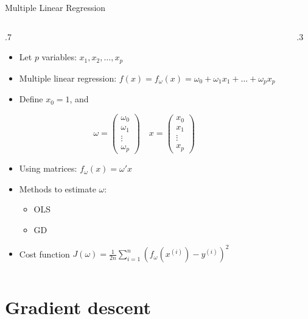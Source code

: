 \documentclass[
  9pt,
  ignorenonframetext,
  aspectratio=169,
  t, dvipsnames]{beamer}
\providecommand{\tightlist}{%
  \setlength{\itemsep}{0pt}\setlength{\parskip}{0pt}}\usepackage{longtable,booktabs,array}
\theoremstyle{definition}
\def\begincols{\begin{columns}}
\def\begincol{\begin{column}}
\def\endcol{\end{column}}
\def\endcols{\end{columns}}
\begin{document}
\begin{frame}{Multiple Linear Regression}
\protect\hypertarget{multiple-linear-regression-1}{}
\begincols

\begincol{.7\textwidth}

\begin{itemize}
\tightlist
\item
  Let \(p\) variables: \(x_1, x_2, \ldots, x_p\)
\item
  Multiple linear regression:
  \(f(x) = f_{\omega}(x) = \omega_0 + \omega_1 x_1 + \ldots + \omega_p x_p\)
\item
  Define \(x_0 = 1\), and
\end{itemize}

\[\omega = \begin{pmatrix}
    \omega_{0} \\
    \omega_{1} \\
    \vdots \\
    \omega_{p}
    \end{pmatrix}    \quad  x = \begin{pmatrix}
    x_{0} \\
    x_{1} \\
    \vdots \\
    x_{p}
    \end{pmatrix}\]

\begin{itemize}
\tightlist
\item
  Using matrices: \(f_{\omega}(x) = \omega' x\)
\item
  Methods to estimate \(\omega\):

  \begin{itemize}
  \tightlist
  \item
    OLS
  \item
    GD
  \end{itemize}
\item
  Cost function
  \(J(\omega) = \frac{1}{2 n} \sum_{i=1}^{n}\left(f_{\omega}\left(x^{(i)}\right)-y^{(i)}\right)^{2}\)
\end{itemize}

\endcol
\begincol{.3\textwidth}
\endcol
\endcols
\end{frame}

\hypertarget{gradient-descent}{%
\section{Gradient descent}\label{gradient-descent}}
\end{document}
